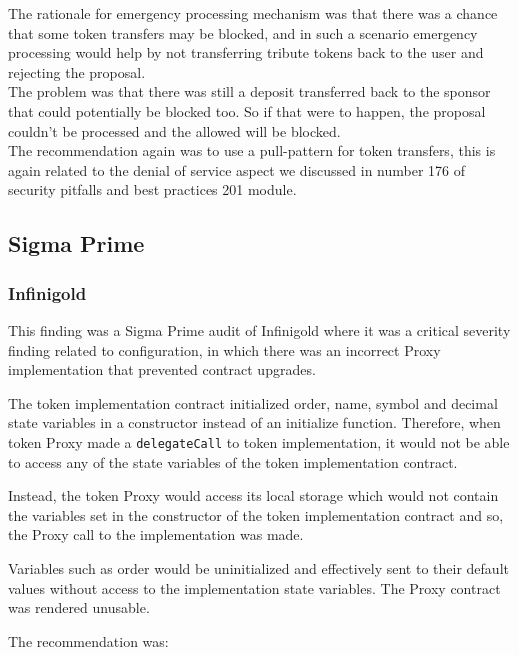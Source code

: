 \begin{itemize}
  The rationale for emergency processing mechanism was that there was a
  chance that some token transfers may be blocked, and in such a
  scenario emergency processing would help by not transferring tribute
  tokens back to the user and rejecting the proposal.\\

  The problem was that there was still a deposit transferred back to the
  sponsor that could potentially be blocked too. So if that were to
  happen, the proposal couldn't be processed and the allowed will be
  blocked.\\

  The recommendation again was to use a pull-pattern for token
  transfers, this is again related to the denial of service aspect we
  discussed in number 176 of security pitfalls and best practices 201
  module.
\end{itemize}

\subsection{Sigma Prime}\label{sigma-prime}

\subsubsection{Infinigold}\label{infinigold}

This finding was a Sigma Prime audit of Infinigold where it was a
critical severity finding related to configuration, in which there was
an incorrect Proxy implementation that prevented contract upgrades.

The token implementation contract initialized order, name, symbol and
decimal state variables in a constructor instead of an initialize
function. Therefore, when token Proxy made a \texttt{delegateCall} to
token implementation, it would not be able to access any of the state
variables of the token implementation contract.

Instead, the token Proxy would access its local storage which would not
contain the variables set in the constructor of the token implementation
contract and so, the Proxy call to the implementation was made.

Variables such as order would be uninitialized and effectively sent to
their default values without access to the implementation state
variables. The Proxy contract was rendered unusable.

The recommendation was:

